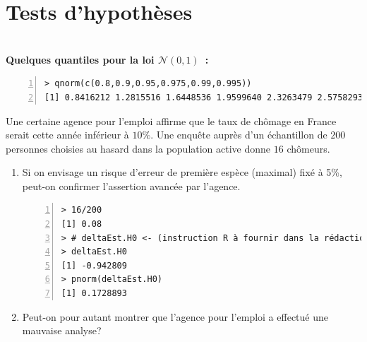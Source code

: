 \documentclass[10pt]{report}
\begin{document}
\chapter{Tests d'hypothèses}\label{TdHypo}
\noindent {}\\

\noindent \textbf{Quelques quantiles pour la loi $\mathcal{N}(0,1)$~:}
\begin{Verbatim}[frame=leftline,fontfamily=tt,fontshape=n,numbers=left]
> qnorm(c(0.8,0.9,0.95,0.975,0.99,0.995))
[1] 0.8416212 1.2815516 1.6448536 1.9599640 2.3263479 2.5758293
\end{Verbatim}


\bigskip

\begin{exercice}
Une certaine agence pour l'emploi affirme que le taux de
chômage en France serait cette année inférieur à $10\%$. Une
enquête auprès d'un échantillon de $200$ personnes choisies au hasard
dans la population active donne $16$ chômeurs.
\begin{enumerate}
\item Si on envisage un risque d'erreur de première 
espèce 
(maximal) 
fixé à 5\%, peut-on confirmer l'assertion avancée par l'agence.\\
\IndicR
\begin{Verbatim}[frame=leftline,fontfamily=tt,fontshape=n,numbers=left]
> 16/200
[1] 0.08
> # deltaEst.H0 <- (instruction R à fournir dans la rédaction)
> deltaEst.H0
[1] -0.942809
> pnorm(deltaEst.H0)
[1] 0.1728893
\end{Verbatim}

\item Peut-on pour autant montrer que l'agence pour 
l'emploi a effectué une mauvaise analyse?
 

\end{enumerate}
\end{exercice}
\end{document}
